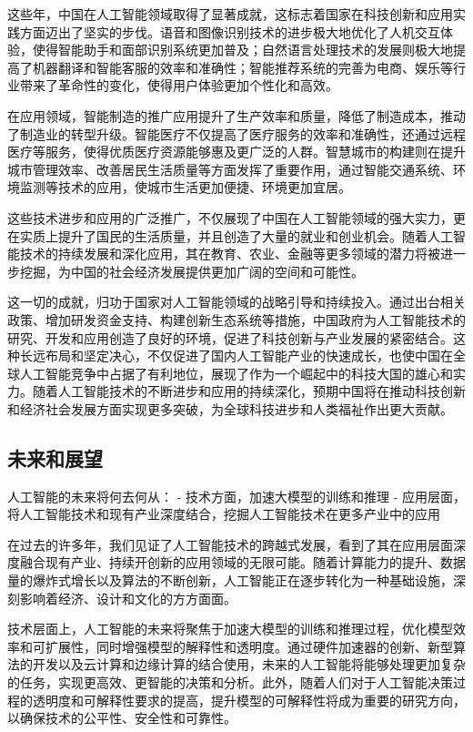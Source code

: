 这些年，中国在人工智能领域取得了显著成就，这标志着国家在科技创新和应用实践方面迈出了坚实的步伐。语音和图像识别技术的进步极大地优化了人机交互体验，使得智能助手和面部识别系统更加普及；自然语言处理技术的发展则极大地提高了机器翻译和智能客服的效率和准确性；智能推荐系统的完善为电商、娱乐等行业带来了革命性的变化，使得用户体验更加个性化和高效。

在应用领域，智能制造的推广应用提升了生产效率和质量，降低了制造成本，推动了制造业的转型升级。智能医疗不仅提高了医疗服务的效率和准确性，还通过远程医疗等服务，使得优质医疗资源能够惠及更广泛的人群。智慧城市的构建则在提升城市管理效率、改善居民生活质量等方面发挥了重要作用，通过智能交通系统、环境监测等技术的应用，使城市生活更加便捷、环境更加宜居。

这些技术进步和应用的广泛推广，不仅展现了中国在人工智能领域的强大实力，更在实质上提升了国民的生活质量，并且创造了大量的就业和创业机会。随着人工智能技术的持续发展和深化应用，其在教育、农业、金融等更多领域的潜力将被进一步挖掘，为中国的社会经济发展提供更加广阔的空间和可能性。

这一切的成就，归功于国家对人工智能领域的战略引导和持续投入。通过出台相关政策、增加研发资金支持、构建创新生态系统等措施，中国政府为人工智能技术的研究、开发和应用创造了良好的环境，促进了科技创新与产业发展的紧密结合。这种长远布局和坚定决心，不仅促进了国内人工智能产业的快速成长，也使中国在全球人工智能竞争中占据了有利地位，展现了作为一个崛起中的科技大国的雄心和实力。随着人工智能技术的不断进步和应用的持续深化，预期中国将在推动科技创新和经济社会发展方面实现更多突破，为全球科技进步和人类福祉作出更大贡献。

\subsection{未来和展望}
人工智能的未来将何去何从：
- 技术方面，加速大模型的训练和推理
- 应用层面，将人工智能技术和现有产业深度结合，挖掘人工智能技术在更多产业中的应用

在过去的许多年，我们见证了人工智能技术的跨越式发展，看到了其在应用层面深度融合现有产业、持续开创新的应用领域的无限可能。随着计算能力的提升、数据量的爆炸式增长以及算法的不断创新，人工智能正在逐步转化为一种基础设施，深刻影响着经济、设计和文化的方方面面。

技术层面上，人工智能的未来将聚焦于加速大模型的训练和推理过程，优化模型效率和可扩展性，同时增强模型的解释性和透明度。通过硬件加速器的创新、新型算法的开发以及云计算和边缘计算的结合使用，未来的人工智能将能够处理更加复杂的任务，实现更高效、更智能的决策和分析。此外，随着人们对于人工智能决策过程的透明度和可解释性要求的提高，提升模型的可解释性将成为重要的研究方向，以确保技术的公平性、安全性和可靠性。

